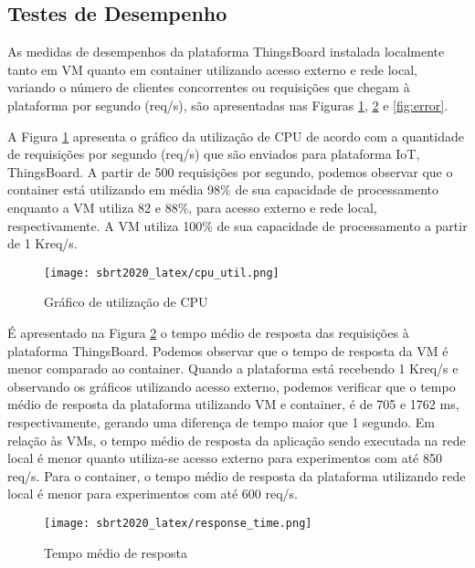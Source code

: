 \documentclass{sbrt}
\begin{document}
\subsection{Testes de Desempenho}
As medidas de desempenhos da plataforma ThingsBoard instalada localmente tanto em VM quanto em container utilizando acesso externo e rede local, variando o número de clientes concorrentes ou requisições que chegam à plataforma por segundo (req/s), são apresentadas nas Figuras \ref{fig:cpu_util}, \ref{fig:rtt} e \ref{fig:error}.

A Figura \ref{fig:cpu_util} apresenta o gráfico da utilização de CPU de acordo com a quantidade de requisições por segundo (req/s) que são enviados para plataforma IoT, ThingsBoard. A partir de 500 requisições por segundo, podemos observar que o container está utilizando em média 98{\%} de sua capacidade de processamento enquanto a VM utiliza 82 e 88{\%}, para acesso externo e rede local, respectivamente. A VM utiliza 100{\%} de sua capacidade de processamento a partir de 1 Kreq/s.

\begin{figure}[hbt]
\centering
\captionsetup{justification=centering}
\label{fig:cpu_util}
\begin{center}
\texttt{[image: sbrt2020\_latex/cpu\_util.png]}
\vspace*{-9mm}
\end{center}
\caption{Gráfico de utilização de CPU}
\label{fig:cpu_util}
\end{figure}

É apresentado na Figura \ref{fig:rtt} o tempo médio de resposta das requisições à plataforma ThingsBoard. Podemos observar que o tempo de resposta da VM é menor comparado ao container. Quando a plataforma está recebendo 1 Kreq/s e observando os gráficos utilizando acesso externo, podemos verificar que o tempo médio de resposta da plataforma utilizando VM e container, é de 705 e 1762 ms, respectivamente, gerando uma diferença de tempo maior que 1 segundo. Em relação às VMs, o tempo médio de resposta da aplicação sendo executada na rede local é menor quanto utiliza-se acesso externo para experimentos com até 850 req/s. Para o container, o tempo médio de resposta da plataforma utilizando rede local é menor para experimentos com até 600 req/s.

\begin{figure}[h]
\centering
\captionsetup{justification=centering}
\begin{center}
\texttt{[image: sbrt2020\_latex/response\_time.png]}
\vspace*{-9mm}
\end{center}
\caption{Tempo médio de resposta}
\label{fig:rtt}
\end{figure}
\end{document}
